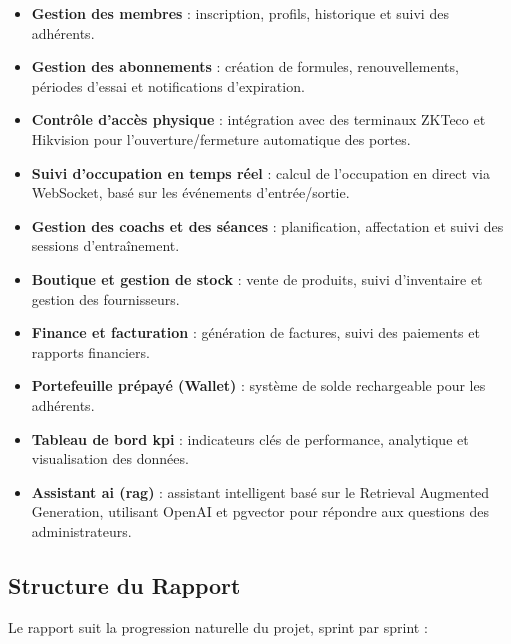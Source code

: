 \documentclass[../main.tex]{subfiles}
\begin{document}
\begin{itemize}
  \item \textbf{Gestion des membres} : inscription, profils, historique et suivi des adh\'{e}rents.
  \item \textbf{Gestion des abonnements} : cr\'{e}ation de formules, renouvellements, p\'{e}riodes d'essai et notifications d'expiration.
  \item \textbf{Contr\^{o}le d'acc\`{e}s physique} : int\'{e}gration avec des terminaux ZKTeco et Hikvision pour l'ouverture/fermeture automatique des portes.
  \item \textbf{Suivi d'occupation en temps r\'{e}el} : calcul de l'occupation en direct via WebSocket, bas\'{e} sur les \'{e}v\'{e}nements d'entr\'{e}e/sortie.
  \item \textbf{Gestion des coachs et des s\'{e}ances} : planification, affectation et suivi des sessions d'entra\^{i}nement.
  \item \textbf{Boutique et gestion de stock} : vente de produits, suivi d'inventaire et gestion des fournisseurs.
  \item \textbf{Finance et facturation} : g\'{e}n\'{e}ration de factures, suivi des paiements et rapports financiers.
  \item \textbf{Portefeuille pr\'{e}pay\'{e} (Wallet)} : syst\`{e}me de solde rechargeable pour les adh\'{e}rents.
  \item \textbf{Tableau de bord \acrshort{kpi}} : indicateurs cl\'{e}s de performance, analytique et visualisation des donn\'{e}es.
  \item \textbf{Assistant \acrshort{ai} (\acrshort{rag})} : assistant intelligent bas\'{e} sur le Retrieval Augmented Generation, utilisant OpenAI et pgvector pour r\'{e}pondre aux questions des administrateurs.
\end{itemize}

\subsection{Structure du Rapport}
Le rapport suit la progression naturelle du projet, sprint par sprint :
\end{document}
